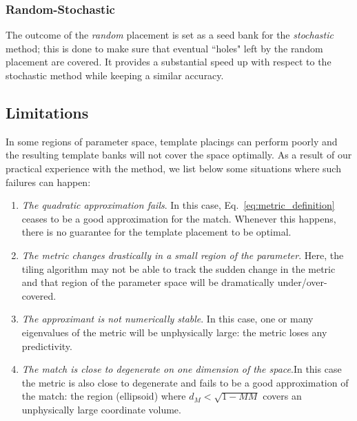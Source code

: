 \documentclass[twocolumn,showpacs,preprintnumbers,nofootinbib,prd,
superscriptaddress,10pt]{revtex4-2}
\begin{document}
\subsubsection{Random-Stochastic}\label{par:randomstochastic}
The outcome of the {\it random} placement is set as a seed bank for the {\it stochastic} method; this is done to make sure that eventual ``holes" left by the random placement are covered. It provides a substantial speed up with respect to the stochastic method while keeping a similar accuracy.


\subsection{Limitations} \label{sec:limitations}

In some regions of parameter space, template placings can perform poorly and the resulting template banks will not cover the space optimally.
As a result of our practical experience with the method, we list below some situations where such failures can happen:

\begin{enumerate}
	\item {\it The quadratic approximation fails}. In this case, Eq.~\eqref{eq:metric_definition} ceases to be a good approximation for the match. Whenever this happens, there is no guarantee for the template placement to be optimal.
	\item {\it The metric changes drastically in a small region of the parameter}. Here, the tiling algorithm may not be able to track the sudden change in the metric and that region of the parameter space will be dramatically under/over-covered.
	\item {\it The approximant is not numerically stable}. In this case, one or many eigenvalues of the metric will be unphysically large: the metric loses any predictivity.
	\item {\it The match is close to degenerate on one dimension of the space}.In this case the metric is also close to degenerate and fails to be a good approximation of the match: the region (ellipsoid) where $d_M<\sqrt{1-MM}$ covers an unphysically large coordinate volume.
\end{enumerate}
\end{document}
